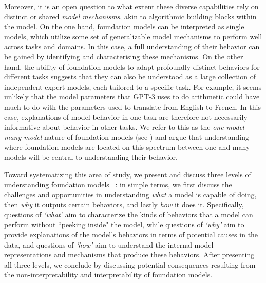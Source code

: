 Moreover, it is an open question to what extent these diverse capabilities rely on distinct or shared \textit{model mechanisms}, akin to algorithmic building blocks within the model.
On the one hand, foundation models can be interpreted as single models, which utilize some set of generalizable model mechanisms to perform well across tasks and domains.
In this case, a full understanding of their behavior can be gained by identifying and characterising these mechanisms.
On the other hand, the ability of foundation models to adapt profoundly distinct behaviors for different tasks suggests that they can also be understood as a large collection of independent expert models, each tailored to a specific task.
For example, it seems unlikely that the model parameters that GPT-3 uses to do arithmetic could have much to do with the parameters used to translate from English to French. 
In this case, explanations of model behavior in one task are therefore not necessarily informative about behavior in other tasks.
We refer to this as the \emph{one model-many model} nature of foundation models (see ) and argue that understanding where foundation models are located on this spectrum between one and many models will be central to understanding their behavior.

Toward systematizing this area of study, we present and discuss three levels of understanding foundation models
~\citep[inspired by][]{marr1982vision}:
in simple terms, we first discuss the challenges and opportunities in understanding \textit{what} a model is capable of doing, then \textit{why} it outputs certain behaviors, and lastly \textit{how} it does it.
Specifically, questions of \emph{`what'} aim to characterize the kinds of behaviors that a model can perform without ``peeking inside" the model, while questions of \emph{`why'} aim to provide explanations of the model's behaviors in terms of potential causes in the data, and questions of \emph{`how'} aim to understand the internal model representations and mechanisms that produce these behaviors.
After presenting all three levels, we conclude by discussing potential consequences resulting from the non-interpretability and interpretability of foundation models.


